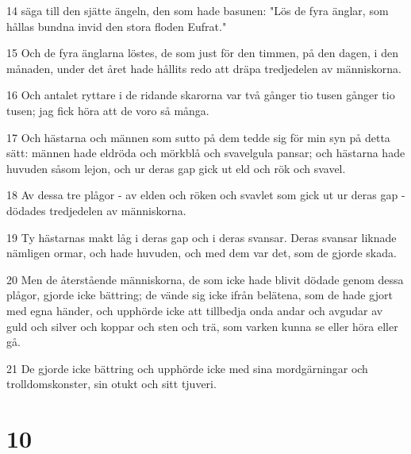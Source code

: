 \par 14 säga till den sjätte ängeln, den som hade basunen: "Lös de fyra änglar, som hållas bundna invid den stora floden Eufrat."
\par 15 Och de fyra änglarna löstes, de som just för den timmen, på den dagen, i den månaden, under det året hade hållits redo att dräpa tredjedelen av människorna.
\par 16 Och antalet ryttare i de ridande skarorna var två gånger tio tusen gånger tio tusen; jag fick höra att de voro så många.
\par 17 Och hästarna och männen som sutto på dem tedde sig för min syn på detta sätt: männen hade eldröda och mörkblå och svavelgula pansar; och hästarna hade huvuden såsom lejon, och ur deras gap gick ut eld och rök och svavel.
\par 18 Av dessa tre plågor - av elden och röken och svavlet som gick ut ur deras gap - dödades tredjedelen av människorna.
\par 19 Ty hästarnas makt låg i deras gap och i deras svansar. Deras svansar liknade nämligen ormar, och hade huvuden, och med dem var det, som de gjorde skada.
\par 20 Men de återstående människorna, de som icke hade blivit dödade genom dessa plågor, gjorde icke bättring; de vände sig icke ifrån belätena, som de hade gjort med egna händer, och upphörde icke att tillbedja onda andar och avgudar av guld och silver och koppar och sten och trä, som varken kunna se eller höra eller gå.
\par 21 De gjorde icke bättring och upphörde icke med sina mordgärningar och trolldomskonster, sin otukt och sitt tjuveri.

\chapter{10}

